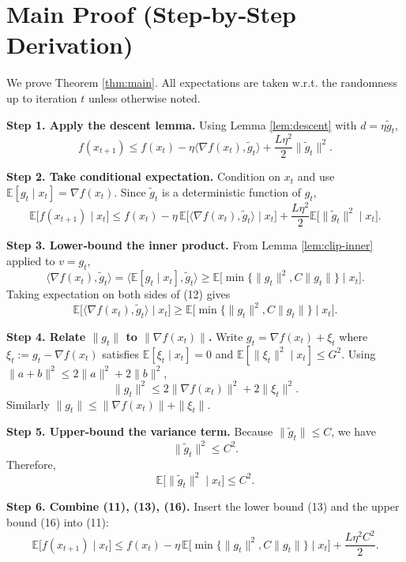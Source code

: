 \documentclass{article}
\newcommand{\E}{\mathbb{E}}
\begin{document}
\section*{Main Proof (Step‑by‑Step Derivation)}
We prove Theorem \ref{thm:main}.  
All expectations are taken w.r.t. the randomness up to iteration $t$ unless otherwise noted.

\noindent\textbf{Step 1. Apply the descent lemma.}  
Using Lemma \ref{lem:descent} with $d=\eta\tilde g_{t}$,
\[
f(x_{t+1})\le f(x_{t})-\eta\langle\nabla f(x_{t}),\tilde g_{t}\rangle
            +\frac{L\eta^{2}}{2}\|\tilde g_{t}\|^{2}.
\tag{10}
\]

\noindent\textbf{Step 2. Take conditional expectation.}  
Condition on $x_{t}$ and use $\E[g_{t}\mid x_{t}]=\nabla f(x_{t})$.
Since $\tilde g_{t}$ is a deterministic function of $g_{t}$,
\[
\E\!\bigl[f(x_{t+1})\mid x_{t}\bigr]
\le f(x_{t})-\eta\,\E\!\bigl[\langle\nabla f(x_{t}),\tilde g_{t}\rangle\mid x_{t}\bigr]
     +\frac{L\eta^{2}}{2}\E\!\bigl[\|\tilde g_{t}\|^{2}\mid x_{t}\bigr].
\tag{11}
\]

\noindent\textbf{Step 3. Lower‑bound the inner product.}  
From Lemma \ref{lem:clip-inner} applied to $v=g_{t}$,
\[
\langle\nabla f(x_{t}),\tilde g_{t}\rangle
   =\langle\E[g_{t}\mid x_{t}],\tilde g_{t}\rangle
   \ge \E\!\bigl[\min\{\|g_{t}\|^{2},C\|g_{t}\|\}\mid x_{t}\bigr].
\tag{12}
\]
Taking expectation on both sides of (12) gives
\[
\E\!\bigl[\langle\nabla f(x_{t}),\tilde g_{t}\rangle\mid x_{t}\bigr]
   \ge \E\!\bigl[\min\{\|g_{t}\|^{2},C\|g_{t}\|\}\mid x_{t}\bigr].
\tag{13}
\]

\noindent\textbf{Step 4. Relate $\|g_{t}\|$ to $\|\nabla f(x_{t})\|$.}  
Write $g_{t}= \nabla f(x_{t})+\xi_{t}$ where $\xi_{t}:=g_{t}-\nabla f(x_{t})$ satisfies $\E[\xi_{t}\mid x_{t}]=0$ and $\E[\|\xi_{t}\|^{2}\mid x_{t}]\le G^{2}$.  
Using $\|a+b\|^{2}\le 2\|a\|^{2}+2\|b\|^{2}$,
\[
\|g_{t}\|^{2}\le 2\|\nabla f(x_{t})\|^{2}+2\|\xi_{t}\|^{2}.
\tag{14}
\]
Similarly $\|g_{t}\|\le \|\nabla f(x_{t})\|+\|\xi_{t}\|$.

\noindent\textbf{Step 5. Upper‑bound the variance term.}  
Because $\|\tilde g_{t}\|\le C$, we have
\[
\|\tilde g_{t}\|^{2}\le C^{2}.
\tag{15}
\]
Therefore,
\[
\E\!\bigl[\|\tilde g_{t}\|^{2}\mid x_{t}\bigr]\le C^{2}.
\tag{16}
\]

\noindent\textbf{Step 6. Combine (11), (13), (16).}  
Insert the lower bound (13) and the upper bound (16) into (11):
\[
\E\!\bigl[f(x_{t+1})\mid x_{t}\bigr]
\le f(x_{t})-\eta\,\E\!\bigl[\min\{\|g_{t}\|^{2},C\|g_{t}\|\}\mid x_{t}\bigr]
     +\frac{L\eta^{2}C^{2}}{2}.
\tag{17}
\]
\end{document}
